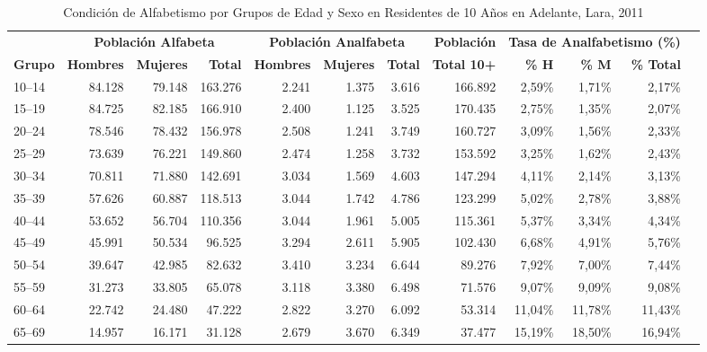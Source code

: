 \documentclass[12pt,letterpaper]{article}
\begin{document}
\begin{table}[htbp]
    \centering
    \caption{Condición de Alfabetismo por Grupos de Edad y Sexo en Residentes de 10 Años en Adelante, Lara, 2011}
    \label{tab:alfabetismo_quinquenal}
    \scriptsize
    \setlength{\tabcolsep}{2.5pt}
    \begin{tabular*}{\textwidth}{@{\extracolsep{\fill}}lrrrrrrrrrrr}
        \toprule
        & \multicolumn{3}{c}{\textbf{Población Alfabeta}} & \multicolumn{3}{c}{\textbf{Población Analfabeta}} & \textbf{Población} & \multicolumn{3}{c}{\textbf{Tasa de Analfabetismo (\%)}} \\
        \cmidrule(lr){2-4} \cmidrule(lr){5-7} \cmidrule(lr){9-11}
        \textbf{Grupo} & \textbf{Hombres} & \textbf{Mujeres} & \textbf{Total} & \textbf{Hombres} & \textbf{Mujeres} & \textbf{Total} & \textbf{Total 10+} & \textbf{\% H} & \textbf{\% M} & \textbf{\% Total} \\
        \midrule
        10--14 & 84.128 & 79.148 & 163.276 & 2.241 & 1.375 & 3.616 & 166.892 & 2,59\% & 1,71\% & 2,17\% \\
        15--19 & 84.725 & 82.185 & 166.910 & 2.400 & 1.125 & 3.525 & 170.435 & 2,75\% & 1,35\% & 2,07\% \\
        20--24 & 78.546 & 78.432 & 156.978 & 2.508 & 1.241 & 3.749 & 160.727 & 3,09\% & 1,56\% & 2,33\% \\
        25--29 & 73.639 & 76.221 & 149.860 & 2.474 & 1.258 & 3.732 & 153.592 & 3,25\% & 1,62\% & 2,43\% \\
        30--34 & 70.811 & 71.880 & 142.691 & 3.034 & 1.569 & 4.603 & 147.294 & 4,11\% & 2,14\% & 3,13\% \\
        35--39 & 57.626 & 60.887 & 118.513 & 3.044 & 1.742 & 4.786 & 123.299 & 5,02\% & 2,78\% & 3,88\% \\
        40--44 & 53.652 & 56.704 & 110.356 & 3.044 & 1.961 & 5.005 & 115.361 & 5,37\% & 3,34\% & 4,34\% \\
        45--49 & 45.991 & 50.534 & 96.525 & 3.294 & 2.611 & 5.905 & 102.430 & 6,68\% & 4,91\% & 5,76\% \\
        50--54 & 39.647 & 42.985 & 82.632 & 3.410 & 3.234 & 6.644 & 89.276 & 7,92\% & 7,00\% & 7,44\% \\
        55--59 & 31.273 & 33.805 & 65.078 & 3.118 & 3.380 & 6.498 & 71.576 & 9,07\% & 9,09\% & 9,08\% \\
        60--64 & 22.742 & 24.480 & 47.222 & 2.822 & 3.270 & 6.092 & 53.314 & 11,04\% & 11,78\% & 11,43\% \\
        65--69 & 14.957 & 16.171 & 31.128 & 2.679 & 3.670 & 6.349 & 37.477 & 15,19\% & 18,50\% & 16,94\% \\

\end{tabular*}
\end{table}
\end{document}
